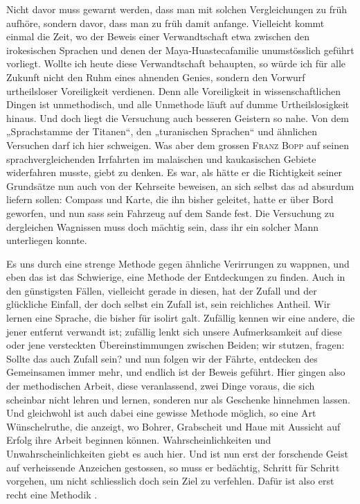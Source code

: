 Nicht davor muss gewarnt werden, dass man mit solchen Vergleichungen zu früh aufhöre, sondern davor, dass man zu früh damit anfange. Vielleicht kommt einmal die Zeit, wo der Beweis einer Ver\label{fp.153}wandtschaft etwa zwischen den irokesischen Sprachen und denen der Maya-Huastecafamilie unumstösslich geführt vorliegt. Wollte ich heute diese Verwandtschaft behaupten, so würde ich für alle Zukunft nicht den Ruhm eines ahnenden Genies, sondern den Vorwurf ur\-theilsloser Voreiligkeit verdienen. Denn alle Voreiligkeit in wissenschaftlichen Dingen ist unmethodisch, und alle Unmethode läuft auf dumme Urtheilslosigkeit hinaus. Und doch liegt die Versuchung auch besseren Geistern so nahe. Von dem „Sprachstamme der Titanen“, den „turanischen Sprachen“ und ähnlichen Versuchen darf ich hier schweigen. Was aber dem grossen \textsc{Franz Bopp} auf seinen sprachvergleichenden Irrfahrten im malaischen und kaukasischen Gebiete widerfahren musste, giebt zu denken. Es war, als hätte er die Richtigkeit seiner Grundsätze nun auch von der Kehrseite beweisen, an sich selbst das  ad absurdum liefern sollen: Compass und Karte, die ihn bisher geleitet, hatte er über Bord geworfen, und nun sass sein Fahrzeug auf dem Sande fest. Die Versuchung zu dergleichen Wagnissen muss doch mächtig sein, dass ihr ein solcher Mann unterliegen konnte.

Es  uns durch eine strenge Methode gegen ähnliche Verirrungen zu wappnen, und eben das ist das Schwierige, eine Methode der Entdeckungen zu finden. Auch in den günstigsten Fällen, vielleicht gerade in diesen, hat der Zufall und der glückliche Einfall, der doch selbst ein Zufall ist, sein reichliches Antheil. Wir lernen eine Sprache, die bisher für isolirt galt. Zufällig kennen wir eine andere, die jener entfernt verwandt ist; zufällig lenkt sich unsere Auf\label{sp.145}merksamkeit auf diese oder jene versteckten Übereinstimmungen zwischen Beiden; wir stutzen, fragen: Sollte das auch Zufall sein? und nun folgen wir der Fährte, entdecken des Gemeinsamen immer mehr, und endlich ist der Beweis geführt. Hier gingen also der methodischen Arbeit, diese veranlassend, zwei Dinge voraus, die sich scheinbar nicht lehren und lernen, sonderen nur als Geschenke hinnehmen lassen. Und gleichwohl ist auch dabei eine gewisse Methode möglich, so eine Art Wünschelruthe, die anzeigt, wo Bohrer, Grabscheit und Haue mit Aussicht auf Erfolg ihre Arbeit beginnen können. Wahrscheinlichkeiten und Unwahrscheinlichkeiten giebt es auch hier. Und ist nun erst der forschende Geist auf verheissende Anzeichen gestossen, so muss er bedächtig, Schritt für Schritt vorgehen, um nicht schliesslich doch sein Ziel zu verfehlen. Dafür ist also erst recht eine Methodik .

